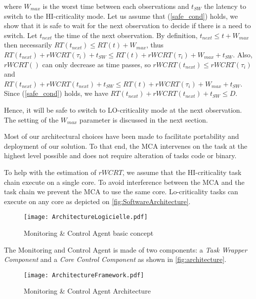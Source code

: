 \documentclass[french, a4paper, 11pt, twoside, pdftex]{StyleThese}
\begin{document}
    where $W_{max}$ is the worst time between each observations and $t_{SW}$ the latency to switch to the HI-criticality mode. Let us assume that (\ref{safe_cond}) holds, we show that it is safe to wait for the next observation to decide if there is a need to switch. Let $t_{next}$ the time of the next observation. 
    By definition, $t_{next} \leq t + W_{max}$ then necessarily $RT(t_{next}) \leq RT(t) + W_{max}$, thus  \\$RT(t_{next}) + rWCRT(\tau_i) + t_{SW} \leq RT(t) + rWCRT(\tau_i) + W_{max} + t_{SW}$. 
    Also, $rWCRT()$ can only decrease as time passes, so $rWCRT(t_{next}) \leq rWCRT(\tau_i)$ and $RT(t_{next}) + rWCRT(t_{next}) + t_{SW} \leq RT(t) + rWCRT(\tau_i) + W_{max} + t_{SW}$. 
    Since (\ref{safe_cond}) holds, we have $RT(t_{next}) + rWCRT(t_{next}) + t_{SW} \leq D$. 

    Hence, it will be safe to switch to LO-criticality mode at the next observation. The setting of the $W_{max}$ parameter is discussed in the next section.

Most of our architectural choices have been made to facilitate portability and deployment of our solution. To that end, the MCA intervenes on the task at the highest level possible and does not require alteration of tasks code or binary.

To help with the estimation of $rWCRT$, we assume that the HI-criticality task chain execute on a single core. To avoid interference between the MCA and the task chain we prevent the MCA to use the same core. Lo-criticality tasks can execute on any core as depicted on \autoref{fig:SoftwareArchitecture}. 

\begin{figure}[ht]
            \centering
            \texttt{[image: ArchitectureLogicielle.pdf]}
            \caption{Monitoring \& Control Agent basic concept} \label{fig:SoftwareArchitecture}
\end{figure}

      The Monitoring and Control Agent is made of two components: a \emph{Task Wrapper Component} and a \emph{Core Control Component} as shown in \autoref{fig:architecture}.
        \begin{figure}[ht]
            \centering
            \texttt{[image: ArchitectureFramework.pdf]}
            \caption{Monitoring \& Control Agent Architecture\label{fig:architecture}}
        \end{figure}
        
        
\end{document}
